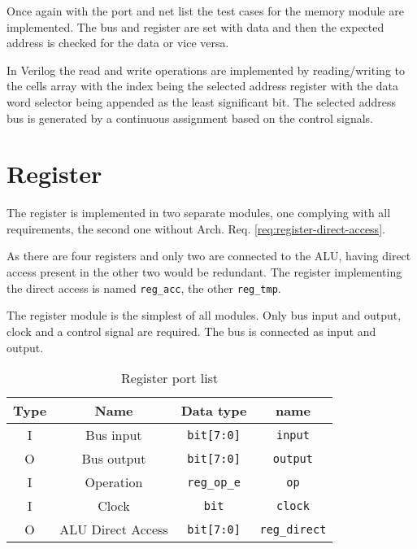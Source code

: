 Once again with the port and net list the test cases for the memory module are implemented. The bus and register are set with data and then the expected address is checked for the data or vice versa.

In Verilog the read and write operations are implemented by reading/writing to the cells array with the index being the selected address register with the data word selector being appended as the least significant bit. The selected address bus is generated by a continuous assignment based on the control signals. 

\section{Register}
The register is implemented in two separate modules, one complying with all requirements, the second one without Arch. Req. \ref{req:register-direct-access}. 

As there are four registers and only two are connected to the ALU, having direct access present in the other two would be redundant. The register implementing the direct access is named \texttt{reg\_acc}, the other \texttt{reg\_tmp}.

The register module is the simplest of all modules. Only bus input and output, clock and a control signal are required. The bus is connected as input and output.

\begin{table}[H]
  
  \begin{center}
  \begin{tabular}{cccc}
   Type & Name               & Data type                       & name                          \\ \hline
   I    & Bus input          & \texttt{bit{[}7:0{]}}          & \texttt{input}                \\
   O    & Bus output         & \texttt{bit{[}7:0{]}}          & \texttt{output}               \\
   I    & Operation          & \texttt{reg\_op\_e}         & \texttt{op}                   \\
   I    & Clock              & \texttt{bit}                   & \texttt{clock}               \\
   O    & ALU Direct Access               & \texttt{bit{[}7:0{]}}          & \texttt{reg\_direct}               \\
   \end{tabular}
  \end{center}
   \caption{Register port list}
   \label{tab:reg-io}
\end{table}

